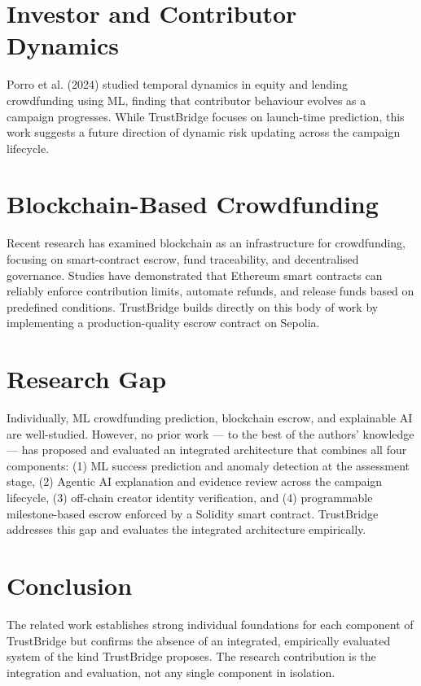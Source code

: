 \section{Investor and Contributor Dynamics}

Porro et al. (2024) studied temporal dynamics in equity and lending crowdfunding using ML, finding that contributor behaviour evolves as a campaign progresses. While TrustBridge focuses on launch-time prediction, this work suggests a future direction of dynamic risk updating across the campaign lifecycle.

\section{Blockchain-Based Crowdfunding}

Recent research has examined blockchain as an infrastructure for crowdfunding, focusing on smart-contract escrow, fund traceability, and decentralised governance. Studies have demonstrated that Ethereum smart contracts can reliably enforce contribution limits, automate refunds, and release funds based on predefined conditions. TrustBridge builds directly on this body of work by implementing a production-quality escrow contract on Sepolia.

\section{Research Gap}

Individually, ML crowdfunding prediction, blockchain escrow, and explainable AI are well-studied. However, no prior work — to the best of the authors' knowledge — has proposed and evaluated an integrated architecture that combines all four components: (1) ML success prediction and anomaly detection at the assessment stage, (2) Agentic AI explanation and evidence review across the campaign lifecycle, (3) off-chain creator identity verification, and (4) programmable milestone-based escrow enforced by a Solidity smart contract. TrustBridge addresses this gap and evaluates the integrated architecture empirically.

\section{Conclusion}

The related work establishes strong individual foundations for each component of TrustBridge but confirms the absence of an integrated, empirically evaluated system of the kind TrustBridge proposes. The research contribution is the integration and evaluation, not any single component in isolation.

